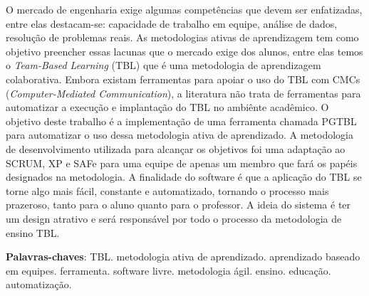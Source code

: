 \begin{resumo}
O mercado de engenharia exige algumas competências que devem ser enfatizadas, entre elas destacam-se: capacidade de trabalho em equipe, análise de dados, resolução de problemas reais. As metodologias ativas de aprendizagem tem como objetivo preencher essas lacunas que o mercado exige dos alunos, entre elas temos o \textit{Team-Based Learning} (TBL) que é uma metodologia de aprendizagem colaborativa. Embora existam ferramentas para apoiar o uso do TBL com CMCs (\textit{Computer-Mediated Communication}), a literatura não trata de ferramentas para automatizar a execução e implantação do TBL no ambiênte acadêmico. O objetivo deste trabalho é a implementação de uma ferramenta chamada PGTBL para automatizar o uso dessa metodologia ativa de aprendizado. A metodologia de desenvolvimento utilizada para alcançar os objetivos foi uma adaptação ao SCRUM, XP e SAFe para uma equipe de apenas um membro que fará os papéis designados na metodologia. A finalidade do software é que a aplicação do TBL se torne algo mais fácil, constante e automatizado, tornando o processo mais prazeroso, tanto para o aluno quanto para o professor. A ideia do sistema é ter um design atrativo e será responsável por todo o processo da metodologia de ensino TBL.

 \vspace{\onelineskip}

 \noindent
 \textbf{Palavras-chaves}: TBL. metodologia ativa de aprendizado. aprendizado baseado em equipes. ferramenta. software
  livre. metodologia ágil. ensino. educação. automatização.
\end{resumo}
